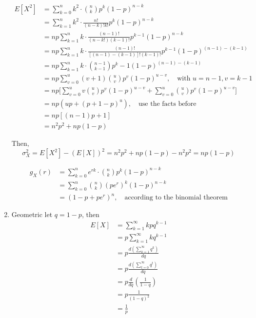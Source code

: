 \documentclass[UTF8]{article}
\begin{document}
\begin{enumerate}
        \begin{equation*}
            \begin{split}
                E[X^2] &= \sum^n_{k=0}k^2\cdot\binom{n}{k}p^k(1-p)^{n-k}\\
                &= \sum^n_{k=1}k^2\cdot\frac{n!}{(n-k)!k!}p^k(1-p)^{n-k}\\
                &= np\sum^n_{k=1}k\cdot\frac{(n-1)!}{(n-k!)(k-1)!}p^{k-1}(1-p)^{n-k}\\
                &=np\sum^n_{k=1}k\cdot\frac{(n-1)!}{[(n-1)-(k-1)]!(k-1)!}p^{k-1}(1-p)^{(n-1)-(k-1)}\\
                &=np\sum^n_{k=1}k\cdot\binom{n-1}{k-1}p^k-1(1-p)^{(n-1)-(k-1)}\\
                &=np\sum^u_{v=0}(v+1)\binom{u}{v}p^v(1-p)^{u-v},\quad\text{with $u=n-1,v=k-1$}\\
                &=np\bigg[\sum^u_{v=0}v\binom{u}{v}p^v(1-p)^{u-v}+\sum^u_{v=0}\binom{u}{v}p^v(1-p)^{u-v}\bigg]\\
                &=np(up+(p+1-p)^u),\quad\text{use the facts before}\\
                &=np[(n-1)p+1]\\
                &=n^2p^2+np(1-p)
            \end{split}
        \end{equation*}

        Then,
        \begin{equation*}
            \sigma^2_X=E[X^2]-(E[X])^2=n^2p^2+np(1-p)-n^2p^2=np(1-p)
        \end{equation*}

        \begin{equation*}
            \begin{split}
                g_X(r) &= \sum^n_{k=0}e^{rk}\cdot\binom{n}{k}p^k(1-p)^{n-k}\\
                &=\sum^n_{k=0}\binom{n}{k}(pe^r)^k(1-p)^{n-k}\\
                &=(1-p+pe^r)^n,\quad\text{according to the binomial theorem}
            \end{split}
        \end{equation*}

        \item Geometric
        let $q=1-p$, then 
        \begin{equation*}
            \begin{split}
                E[X] &=\sum^\infty_{k=1}kpq^{k-1}\\
                &=p\sum^\infty_{k=1}kq^{k-1}\\
                &=p\frac{d(\sum^\infty_{k=1}q^k)}{dq}\\
                &=p\frac{d(\sum^\infty_{t=0}q^t)}{dq}\\
                &=p\frac{d}{dq}(\frac{1}{1-q})\\
                &=p\frac{1}{(1-q)^2}\\
                &=\frac{1}{p}
            \end{split}
        \end{equation*}


\end{enumerate}
\end{document}
